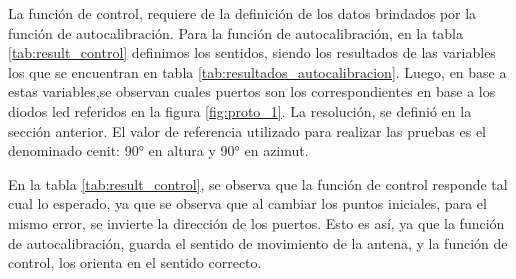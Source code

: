 La función de control, requiere de la definición de los datos brindados por la función de autocalibración. Para la función de autocalibración, en la tabla \ref{tab:result_control} definimos los sentidos, siendo los resultados de las variables los que se encuentran en tabla \ref{tab:resultados_autocalibracion}. Luego, en base a estas variables,se observan cuales puertos son los correspondientes en base a los diodos led referidos en la figura \ref{fig:proto_1}. La resolución, se definió en la sección anterior. El valor de referencia utilizado para realizar las pruebas es el denominado cenit: 90° en altura y 90° en azimut. 

En la tabla \ref{tab:result_control}, se observa que la función de control responde tal cual lo esperado, ya que se observa que al cambiar los puntos iniciales, para el mismo error, se invierte la dirección de los puertos. Esto es así, ya que la función de autocalibración, guarda el sentido de movimiento de la antena, y la función de control, los orienta en el sentido correcto.    


